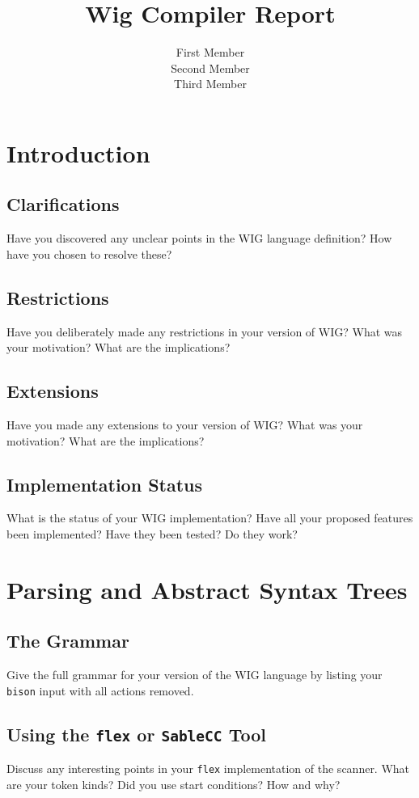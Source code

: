 \documentclass{WigReport}
\title{Wig Compiler Report}
\author{First Member \\  %
        Second Member \\
        Third Member}
\begin{document}
\MakeTitlePage
\tableofcontents
\listoffigures %
\listoftables  %
\clearpage

%
\section{Introduction}
\subsection{Clarifications}
Have you discovered any unclear points in the WIG language definition?
How have you chosen to resolve these?

\subsection{Restrictions}
Have you deliberately made any restrictions in your version of WIG?
What was your motivation? What are the implications?

\subsection{Extensions}
Have you made any extensions to your version of WIG?
What was your motivation? What are the implications?

\subsection{Implementation Status}
What is the status of your WIG implementation? Have all your proposed
features been implemented? Have they been tested? Do they work?

\section{Parsing and Abstract Syntax Trees}
\subsection{The Grammar}
Give the full grammar for your version of the WIG language by
listing your {\tt bison} input with all actions removed.

\subsection{Using the {\tt flex} or {\tt SableCC} Tool}
Discuss any interesting points in your {\tt flex} implementation of the
scanner. What are your token kinds?
Did you use start conditions? How and why?
\end{document}
